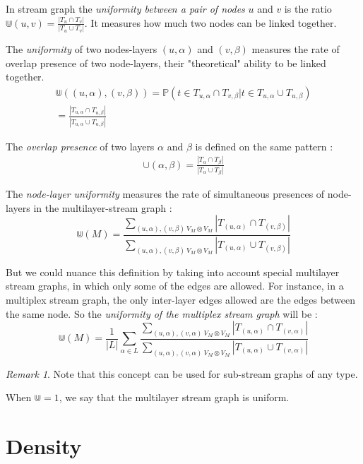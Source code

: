 \documentclass[dvipsnames,a4paper,11pt]{article}
\theoremstyle{definition}
\theoremstyle{remark}
\newtheorem{rmq}{Remark}
\theoremstyle{remark}
\begin{document}
	In stream graph the {\em uniformity between a pair of nodes} $u$ and $v$ is the ratio $\Cup (u,v) = \frac{|T_u\cap T_v|}{|T_u \cup T_v|}$. It measures how much two nodes can be linked together.
	
	
	The {\em uniformity } of two nodes-layers $(u,\alpha)$ and $(v,\beta)$ measures the rate of overlap presence of two node-layers, their "theoretical" ability to be linked together.
	\begin{align*}
		\Cup((u,\alpha),(v,\beta))=\mathbb{P}( t \in T_{u,\alpha} \cap T_{v,\beta} | t \in T_{u,\alpha} \cup T_{u,\beta}) \\
		= \frac{|T_{u,\alpha}\cap T_{u,\beta}|}{|T_{u,\alpha}\cup T_{u,\beta}|}
	\end{align*}

	The {\em overlap presence} of two layers $\alpha$ and $\beta$ is defined on the same pattern :
	\begin{align*}
		\cup(\alpha,\beta) = \frac{|T_{\alpha}\cap T_{\beta}|}{|T_{\alpha}\cup T_{\beta}|}
	\end{align*}

    The {\em node-layer uniformity} measures the rate of simultaneous presences of node-layers in the multilayer-stream graph :
    \[
    	\Cup(M) = \frac{\sum_{(u,\alpha),(v,\beta) \ V_M \otimes V_M}{|T_{(u,\alpha)} \cap T_{(v,\beta)}|}}{\sum_{(u,\alpha),(v,\beta) \ V_M \otimes V_M}{|T_{(u,\alpha)}\cup T_{(v,\beta)}|}}
    \]
	
	But we could nuance this definition by taking into account special multilayer stream graphs, in which only some of the edges are allowed. For instance, in a multiplex stream graph, the only inter-layer edges allowed are the edges between the same node. So the {\em uniformity of the multiplex stream graph} will be :
	\[
    	\Cup(M) = \frac{1}{|L|}\sum_{\alpha \in L} \frac{\sum_{(u,\alpha),(v,\alpha) \ V_M \otimes V_M}{|T_{(u,\alpha)} \cap T_{(v,\alpha)}|}}{\sum_{(u,\alpha),(v,\alpha) \ V_M \otimes V_M}{|T_{(u,\alpha)}\cup T_{(v,\alpha)}|}}
    \]
	
	
	
	\begin{rmq}
		Note that this concept can be used for sub-stream graphs of any type.
	\end{rmq}

	When $\Cup=1$, we say that the multilayer stream graph is uniform.



    \section{Density}
    
\end{document}
